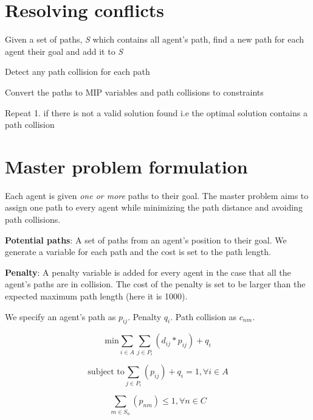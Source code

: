 \documentclass[a4paper,11pt]{article}
\begin{document}
\section{Resolving conflicts}
\begin{compactenum}
	\item Given a set of paths, \textit{S} which contains all agent's path, find a new path for each agent their goal and add it to \textit{S}
	\item Detect any path collision for each path
	\item Convert the paths to MIP variables and path collisions to constraints
	\item Repeat 1. if there is not a valid solution found i.e the optimal solution contains a path collision
\end{compactenum}

\section{Master problem formulation}
Each agent is given \textit{one or more} paths to their goal. The master problem aims to assign one path to every agent while minimizing the path distance and avoiding path collisions. 

\begin{compactitem}
	\item \textbf{Potential paths}: A set of paths from an agent's position to their goal. We generate a variable for each path and the cost is set to the path length.
	\item \textbf{Penalty}: A penalty variable is added for every agent in the case that all the agent's paths are in collision. The cost of the penalty is set to be larger than the expected maximum path length (here it is 1000).
\end{compactitem}

We specify an agent's path as $p_{ij}$. Penalty $q_i$. Path collision as $c_{nm}$.

\begin{equation}
\text{min} \sum_{i \in A} \sum_{j \in P_i} (d_{ij} * p_{ij}) + q_i
\end{equation}

\begin{equation} %
\text{subject to} \sum_{j \in P_i} (p_{ij}) + q_i = 1, \forall i \in A
\end{equation}

\begin{equation} %
\sum_{m \in S_n} (p_{nm}) \le 1, \forall n \in C
\end{equation}
\end{document}
